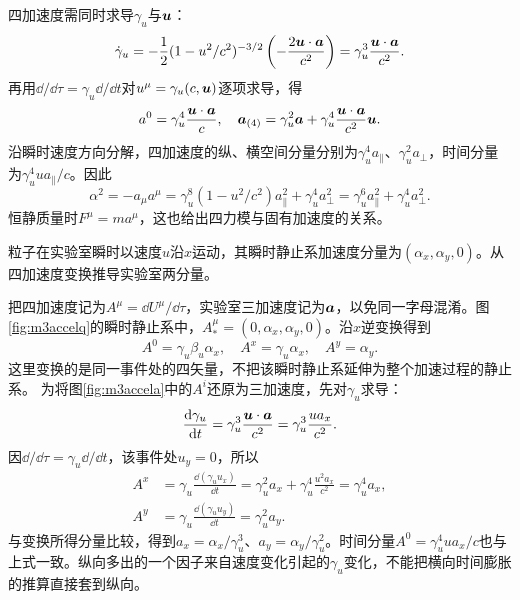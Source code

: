 四加速度需同时求导$\gamma_u$与$\bm{u}$：
\[
 \dot\gamma_u=-\frac12(1-u^2/c^2)^{-3/2}
 \left(-\frac{2\bm{u}\cdot\bm{a}}{c^2}\right)
 =\gamma_u^3\frac{\bm{u}\cdot\bm{a}}{c^2}.
\]
再用$\dd/\dd\tau=\gamma_u\dd/\dd t$对$u^\mu=\gamma_u(c,\bm{u})$逐项求导，得
\[
 a^0=\gamma_u^4\frac{\bm{u}\cdot\bm{a}}{c},\quad
 \bm{a}_{(4)}=\gamma_u^2\bm{a}+\gamma_u^4\frac{\bm{u}\cdot\bm{a}}{c^2}\bm{u}.
\]
沿瞬时速度方向分解，四加速度的纵、横空间分量分别为$\gamma_u^4a_\parallel$、$\gamma_u^2a_\perp$，时间分量为$\gamma_u^4ua_\parallel/c$。因此
\[
 \alpha^2=-a_\mu a^\mu
 =\gamma_u^8(1-u^2/c^2)a_\parallel^2+\gamma_u^4a_\perp^2
 =\gamma_u^6a_\parallel^2+\gamma_u^4a_\perp^2.
\]
恒静质量时$F^\mu=ma^\mu$，这也给出四力模与固有加速度的关系。

\begin{example}\label{ex:m3accel}
粒子在实验室瞬时以速度$u$沿$x$运动，其瞬时静止系加速度分量为$(\alpha_x,\alpha_y,0)$。从四加速度变换推导实验室两分量。
\end{example}
\begin{solution}
把四加速度记为$A^\mu=\dd U^\mu/\dd\tau$，实验室三加速度记为$\bm{a}$，以免同一字母混淆。图\ref{fig:m3accelq}的瞬时静止系中，$A_*^\mu=(0,\alpha_x,\alpha_y,0)$。沿$x$逆变换得到
\[
 A^0=\gamma_u\beta_u\alpha_x,\quad
 A^x=\gamma_u\alpha_x,\quad A^y=\alpha_y.
\]
这里变换的是同一事件处的四矢量，不把该瞬时静止系延伸为整个加速过程的静止系。
为将图\ref{fig:m3accela}中的$A^i$还原为三加速度，先对$\gamma_u$求导：
\[
 \frac{\mathop{}\!\mathrm d\gamma_u}{\mathop{}\!\mathrm d t}=\gamma_u^3\frac{\bm{u}\cdot\bm{a}}{c^2}
 =\gamma_u^3\frac{ua_x}{c^2}.
\]
因$\dd/\dd\tau=\gamma_u\dd/\dd t$，该事件处$u_y=0$，所以
\begin{align*}
 A^x&=\gamma_u\frac{\dd(\gamma_u u_x)}{\dd t}
 =\gamma_u^2a_x+\gamma_u^4\frac{u^2a_x}{c^2}
 =\gamma_u^4a_x,\\
 A^y&=\gamma_u\frac{\dd(\gamma_u u_y)}{\dd t}=\gamma_u^2a_y.
\end{align*}
与变换所得分量比较，得到$a_x=\alpha_x/\gamma_u^3$、$a_y=\alpha_y/\gamma_u^2$。时间分量$A^0=\gamma_u^4ua_x/c$也与上式一致。纵向多出的一个因子来自速度变化引起的$\gamma_u$变化，不能把横向时间膨胀的推算直接套到纵向。
\end{solution}

